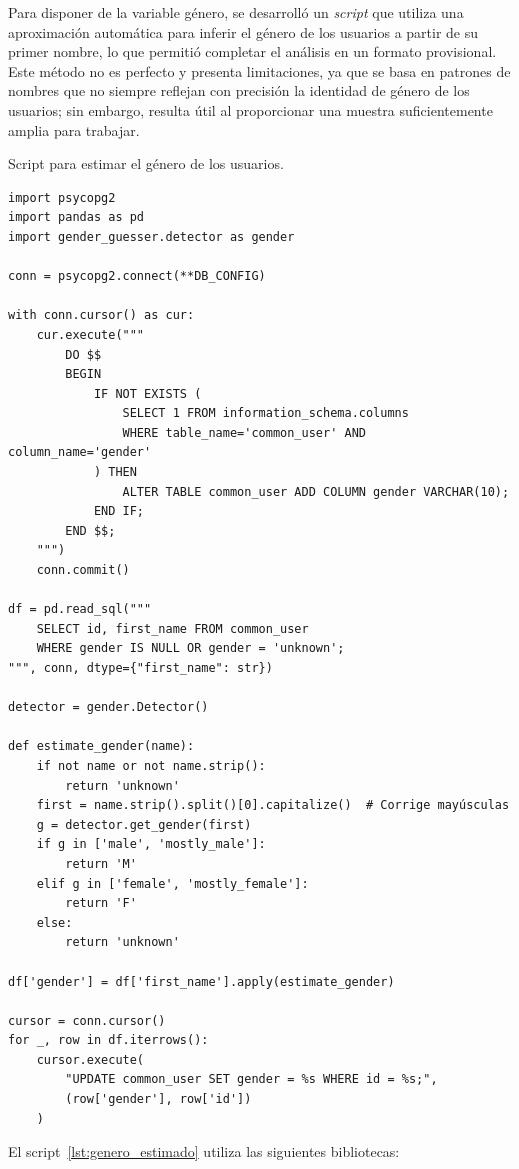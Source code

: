 \documentclass[a4paper, 12pt]{book}
\begin{document}
Para disponer de la variable género, se desarrolló un \textit{script} que utiliza una aproximación automática para inferir el género de los usuarios a partir de su primer nombre, lo que permitió completar el análisis en un formato provisional. Este método no es perfecto y presenta limitaciones, ya que se basa en patrones de nombres que no siempre reflejan con precisión la identidad de género de los usuarios; sin embargo, resulta útil al proporcionar una muestra suficientemente amplia para trabajar.

\begin{listing}[h!]
\caption{Script para estimar el género de los usuarios.}
\label{lst:genero_estimado}
\begin{verbatim}
import psycopg2
import pandas as pd
import gender_guesser.detector as gender

conn = psycopg2.connect(**DB_CONFIG)

with conn.cursor() as cur:
    cur.execute("""
        DO $$
        BEGIN
            IF NOT EXISTS (
                SELECT 1 FROM information_schema.columns 
                WHERE table_name='common_user' AND column_name='gender'
            ) THEN
                ALTER TABLE common_user ADD COLUMN gender VARCHAR(10);
            END IF;
        END $$;
    """)
    conn.commit()

df = pd.read_sql("""
    SELECT id, first_name FROM common_user 
    WHERE gender IS NULL OR gender = 'unknown';
""", conn, dtype={"first_name": str})

detector = gender.Detector()

def estimate_gender(name):
    if not name or not name.strip():
        return 'unknown'
    first = name.strip().split()[0].capitalize()  # Corrige mayúsculas
    g = detector.get_gender(first)
    if g in ['male', 'mostly_male']:
        return 'M'
    elif g in ['female', 'mostly_female']:
        return 'F'
    else:
        return 'unknown'

df['gender'] = df['first_name'].apply(estimate_gender)

cursor = conn.cursor()
for _, row in df.iterrows():
    cursor.execute(
        "UPDATE common_user SET gender = %s WHERE id = %s;",
        (row['gender'], row['id'])
    )
\end{verbatim}
\end{listing}

El script~\ref{lst:genero_estimado} utiliza las siguientes bibliotecas:
\end{document}
